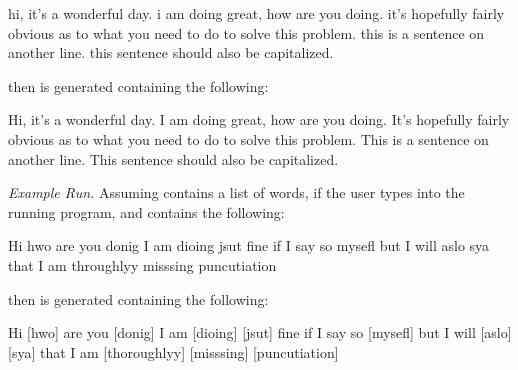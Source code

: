     \begin{verbnobox}[\small]
hi, it's a wonderful day. i am doing great, how are you doing. it's 
hopefully fairly obvious as to what you need to do to solve this problem.
this is a sentence on another line.
this sentence should also be capitalized.
    \end{verbnobox}

    then  is generated containing the following:

    \begin{verbnobox}[\small]
Hi, it's a wonderful day. I am doing great, how are you doing. It's 
hopefully fairly obvious as to what you need to do to solve this problem.
This is a sentence on another line.
This sentence should also be capitalized.
    \end{verbnobox}


    \textit{Example Run.} Assuming  contains a list of words, if the user types  into the running program, and  contains the following:

    \begin{verbnobox}[\small]
Hi hwo are you donig I am dioing jsut fine if I say so mysefl but I 
will aslo sya that I am throughlyy misssing puncutiation
    \end{verbnobox}

    then  is generated containing the following:

    \begin{verbnobox}[\small]
Hi [hwo] are you [donig] I am [dioing] [jsut] fine if I say so 
[mysefl] but I will [aslo] [sya] that I am [thoroughlyy] [misssing] 
[puncutiation]
    \end{verbnobox}


